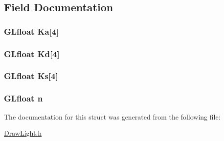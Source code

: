 \subsection{Field Documentation}
\hypertarget{structmaterial_struct_a8938ed07909242f433e3c469ec08ecf4}{
\subsubsection[{Ka}]{\setlength{\rightskip}{0pt plus 5cm}G\-Lfloat Ka\mbox{[}4\mbox{]}}}\label{structmaterial_struct_a8938ed07909242f433e3c469ec08ecf4}
\hypertarget{structmaterial_struct_a83cf9cdeaf839d8efb4300e303bcae3a}{
\subsubsection[{Kd}]{\setlength{\rightskip}{0pt plus 5cm}G\-Lfloat Kd\mbox{[}4\mbox{]}}}\label{structmaterial_struct_a83cf9cdeaf839d8efb4300e303bcae3a}
\hypertarget{structmaterial_struct_a73f521d42656a51d63698b9fb6b7afaa}{
\subsubsection[{Ks}]{\setlength{\rightskip}{0pt plus 5cm}G\-Lfloat Ks\mbox{[}4\mbox{]}}}\label{structmaterial_struct_a73f521d42656a51d63698b9fb6b7afaa}
\hypertarget{structmaterial_struct_afeb08cec27be22b9750519cf67fbdb62}{
\subsubsection[{n}]{\setlength{\rightskip}{0pt plus 5cm}G\-Lfloat n}}\label{structmaterial_struct_afeb08cec27be22b9750519cf67fbdb62}


The documentation for this struct was generated from the following file\-:\begin{DoxyCompactItemize}
\item 
\hyperlink{_draw_light_8h}{Draw\-Light.\-h}\end{DoxyCompactItemize}
